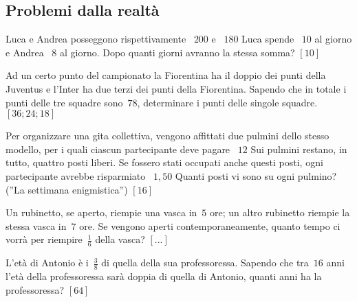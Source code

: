 \subsection{Problemi dalla realtà}

\begin{htmulticols}{2}
\begin{esercizio}[*]
\label{ese:14.39}
Luca e Andrea posseggono rispettivamente \officialeuro~\(200\) e 
\officialeuro~\(180\) Luca spende \officialeuro~\(10\) al giorno e Andrea 
\officialeuro~\(8\) al giorno. Dopo quanti giorni avranno la stessa somma? 
\hfill \(\left[10\right]\)
\end{esercizio}

\begin{esercizio}[*]
\label{ese:14.40}
Ad un certo punto del campionato la Fiorentina ha il doppio dei punti della 
Juventus e l'Inter ha due terzi dei punti della Fiorentina. Sapendo che in 
totale i punti delle tre squadre sono~\(78\), determinare i punti delle singole 
squadre. \hfill \(\left[36; 24; 18\right]\)
\end{esercizio}

\begin{esercizio}[*]
\label{ese:14.41}
Per organizzare una gita collettiva, vengono affittati due pulmini dello stesso 
modello, per i quali ciascun partecipante deve pagare \officialeuro~\(12\) Sui 
pulmini restano, in tutto, quattro posti liberi. Se fossero stati occupati 
anche 
questi posti, ogni partecipante avrebbe risparmiato \officialeuro~\(1,50\) 
Quanti 
posti vi sono su ogni pulmino? (''La settimana enigmistica'') 
\hfill \(\left[16\right]\)
\end{esercizio}

\begin{esercizio}
\label{ese:14.42}
Un rubinetto, se aperto, riempie una vasca in~\(5\) ore; un altro rubinetto 
riempie la stessa vasca in~\(7\) ore. Se vengono aperti contemporaneamente, 
quanto 
tempo ci vorrà per riempire~\(\frac{1}{6}\) della vasca?\hfill 
\(\left[...\right]\)
\end{esercizio}

\begin{esercizio}[*]
\label{ese:14.43}
L'età di Antonio è i~\(\frac{3}{8}\) di quella della sua professoressa. Sapendo 
che tra~\(16\) anni l'età della professoressa sarà doppia di quella di Antonio, 
quanti anni ha la professoressa? \hfill \(\left[64\right]\)
\end{esercizio}


\end{htmulticols}
